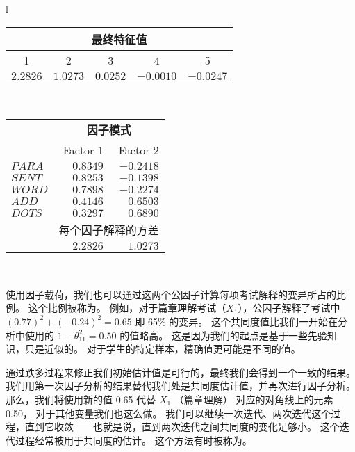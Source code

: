 \begin{table}
\begin{floatrow}
{\begin{tabular}{l}
\begin{minipage}{0.5\textwidth}
                    \begin{tabular}{ccccc}
                        \multicolumn{5}{c}{\bfseries 最终特征值} \\\midrule
                        1 & 2 & 3 & 4 & 5 \\ 
                        $2.2826$ & $1.0273$ & $0.0252$ & $-0.0010$ & $-0.0247$ \\ 
                    \end{tabular}
                \end{minipage} \\\bottomrule
                \begin{minipage}{0.5\textwidth}
                    \begin{tabular}{lrr}
                        & \multicolumn{2}{c}{\bfseries 因子模式} \\\cmidrule{2-3}
                        & Factor 1 & Factor 2 \\ 
                        $ PARA $ & $0.8349$ & $-0.2418$ \\
                        $ SENT $ & $0.8253$ & $-0.1398$ \\
                        $ WORD $ & $0.7898$ & $-0.2274$ \\
                        $ ADD  $ & $0.4146$ & $ 0.6503$ \\
                        $ DOTS $ & $0.3297$ & $ 0.6890$ \\
                        & \multicolumn{2}{c}{每个因子解释的方差} \\
                        & $2.2826$ & $1.0273$ \\ 
                    \end{tabular}
                \end{minipage}\\\bottomrule
            \end{tabular}
        }
    \end{floatrow}
\end{table}

使用因子载荷，我们也可以通过这两个公因子计算每项考试解释的变异所占的比例。
这个比例被称为。
例如，对于篇章理解考试（$ X_1 $），公因子解释了考试中 $ (0.77)^2 + (-0.24)^2 = 0.65 $ 即 65\% 的变异。
这个共同度值比我们一开始在分析中使用的 $ 1 - \theta_{11}^2 = 0.50 $ 的值略高。
这是因为我们的起点是基于一些先验知识，只是近似的。
对于学生的特定样本，精确值更可能是不同的值。

通过跌多过程来修正我们初始估计值是可行的，最终我们会得到一个一致的结果。
我们用第一次因子分析的结果替代我们处是共同度估计值，并再次进行因子分析。
那么，我们将使用新的值 0.65 代替 $ X_1 $ （篇章理解） 对应的对角线上的元素 0.50，
对于其他变量我们也这么做。
我们可以继续一次迭代、两次迭代这个过程，直到它收敛——也就是说，直到两次迭代之间共同度的变化足够小。
这个迭代过程经常被用于共同度的估计。
这个方法有时被称为。

